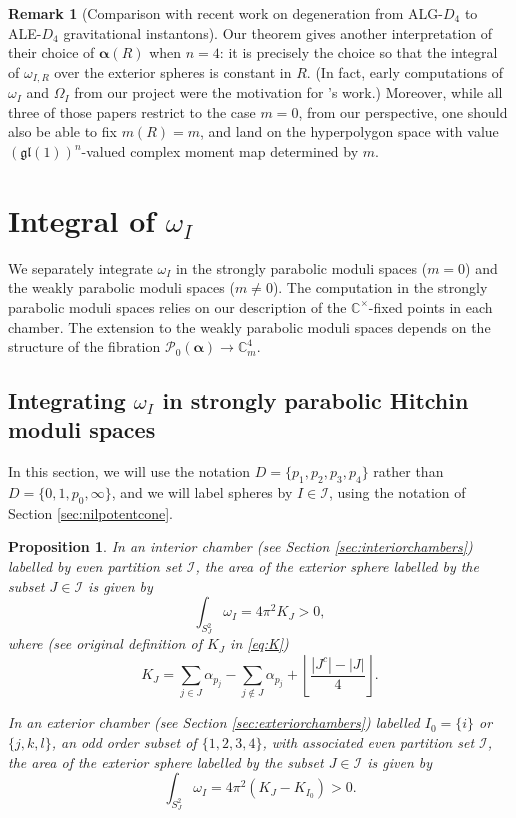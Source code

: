 \documentclass[12pt,letterpaper,reqno]{amsart}
\def\mathbf#1{#1}%
\newtheorem{prop}[thm]{Proposition}
\theoremstyle{remark}
\theoremstyle{definition}
\newtheorem{rem}[thm]{Remark}
\numberwithin{thm}{section}
\numberwithin{equation}{section}
\numberwithin{figure}{section}
\newcommand{\C}{\ensuremath{\mathbb C}}
\begin{document}
\begin{rem}[Comparison with recent work on degeneration from ALG-$D_4$ to ALE-$D_4$ gravitational instantons]
Our theorem gives another interpretation of their choice of $\boldsymbol{\alpha}(R)$ when $n=4$: it is precisely the choice so that the integral of $\omega_{I,R}$ over the exterior spheres is constant in $R$. (In fact, early computations of $\omega_I$ and $\Omega_I$ from our project were the motivation for \cite{FredricksonYae}'s work.)  Moreover, while all three of those papers restrict to the case $\mathbf{m}=\mathbf{0}$, from our perspective, one should also be able to fix $\mathbf{m}(R)=\mathbf{m}$, and land on the hyperpolygon space with value $\left(\mathfrak{gl}(1)\right)^n$-valued complex moment map determined by $\mathbf{m}$.
\end{rem}

   
\section{Integral of \texorpdfstring{$\omega_I$}{the real symplectic form}}\label{sec:TorelliomegaI}

We separately integrate $\omega_I$ in the strongly parabolic moduli spaces ($\mathbf{m}=\mathbf{0}$) and the weakly parabolic moduli spaces ($\mathbf{m}\neq \mathbf{0}$). The computation in the strongly parabolic moduli spaces relies on our description of the $\C^\times$-fixed points in each chamber. The extension to the weakly parabolic moduli spaces depends on the structure of the fibration $\mathcal{P}_0(\boldsymbol{\alpha}) \to \C^4_{\mathbf{m}}$.

 
\subsection{Integrating \texorpdfstring{$\omega_I$}{the real symplectic form} in strongly parabolic Hitchin moduli spaces} 

In this section, we will use the notation $D=\{p_1, p_2, p_3, p_4\}$ rather than $D=\{0, 1, p_0, \infty\}$, and we will label spheres by $I \in \mathcal{I}$, using the notation of Section \ref{sec:nilpotentcone}.

\begin{prop}\label{prop:stronglyparabolicvolumesv2}
In an interior chamber (see Section \ref{sec:interiorchambers}) labelled by even partition set $\mathcal{I}$, the area of the exterior sphere labelled by the subset $J \in \mathcal{I}$ is given by 
\[\int_{S^2_J} \omega_I = 4 \pi^2 K_J>0,\]
where (see original definition of $K_J$ in \eqref{eq:K})
\[K_J = \sum_{j \in J} \alpha_{p_j} -\sum_{j \notin J} \alpha_{p_j} +\left\lfloor \frac{|J^c| - |J|}{4}\right\rfloor.\]

In an exterior chamber (see Section \ref{sec:exteriorchambers}) labelled $I_0=\{i\}$ or $\{j, k, l\}$, an odd order subset of $\{1, 2, 3, 4\}$,  with associated even partition set $\mathcal{I}$, 
the area of the exterior sphere labelled by the subset $J \in \mathcal{I}$  is given by 
\[\int_{S^2_J} \omega_I = 4 \pi^2 \left(K_J- K_{I_0} \right)>0.\]
\end{prop}
\end{document}
